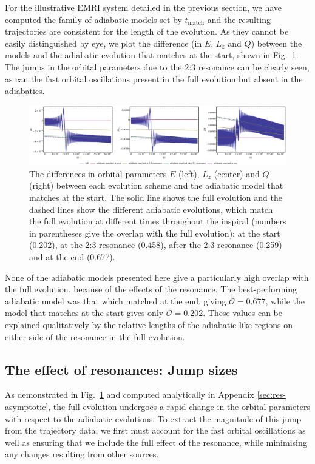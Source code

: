 \documentclass[aps,prd,amsfonts,amssymb,amsmath,nofootinbib,reprint,showpacs,superscriptaddress,twocolumn]{revtex4}
\newcommand{\figref}[1]{Fig.\ \ref{fig:#1}}
\newcommand{\apref}[1]{Appendix \ref{sec:#1}}
\begin{document}
For the illustrative EMRI system detailed in the previous section, we have computed the family of adiabatic models set by $t_{\mathrm{match}}$ and the resulting trajectories are consistent for the length of the evolution. As they cannot be easily distinguished by eye, we plot the difference (in $E$, $L_z$ and $Q$) between the models and the adiabatic evolution that matches at the start, shown in \figref{res-diff-traj}. The jumps in the orbital parameters due to the 2:3 resonance can be clearly seen, as can the fast orbital oscillations present in the full evolution but absent in the adiabatics.

\begin{figure}[htbp]
\centering
\includegraphics[width=\textwidth]{Fig_res_diff_traj}
\caption{\label{fig:res-diff-traj}The differences in orbital parameters $E$ (left), $L_z$ (center) and $Q$ (right) between each evolution scheme and the adiabatic model that matches at the start. The solid line shows the full evolution and the dashed lines show the different adiabatic evolutions, which match the full evolution at different times throughout the inspiral (numbers in parentheses give the overlap with the full evolution): at the start (0.202), at the 2:3 resonance (0.458), after the 2:3 resonance (0.259) and at the end (0.677).}
\end{figure}

None of the adiabatic models presented here give a particularly high overlap with the full evolution, because of the effects of the resonance. The best-performing adiabatic model was that which matched at the end, giving $\mathcal{O} = 0.677$, while the model that matches at the start gives only $\mathcal{O} = 0.202$. These values can be explained qualitatively by the relative lengths of the adiabatic-like regions on either side of the resonance in the full evolution. 

\subsection{The effect of resonances: Jump sizes}

As demonstrated in \figref{res-diff-traj} and computed analytically in \apref{res-asymptotic}, the full evolution undergoes a rapid change in the orbital parameters with respect to the adiabatic evolutions. To extract the magnitude of this jump from the trajectory data, we first must account for the fast orbital oscillations as well as ensuring that we include the full effect of the resonance, while minimising any changes resulting from other sources.
\end{document}
